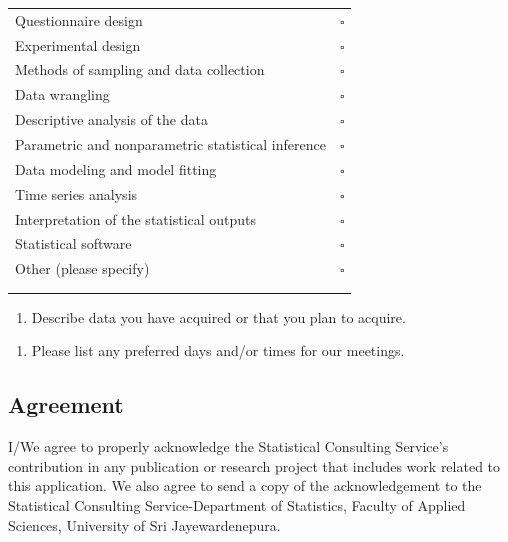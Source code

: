 \documentclass[
  a4paper]{article}
\providecommand{\tightlist}{%
  \setlength{\itemsep}{0pt}\setlength{\parskip}{0pt}}
\begin{document}
\begin{table}[!h]
\center
\begin{tabular}{l|l}
\hline
Questionnaire design & $\square$ \\ 
Experimental design &  $\square$  \\ 
Methods of sampling and data collection &   $\square$ \\
Data wrangling &  $\square$\\
Descriptive analysis of the data &  $\square$\\
Parametric and nonparametric statistical inference &  $\square$\\
Data modeling and model fitting &  $\square$ \\
Time series analysis &  $\square$ \\
Interpretation of the statistical outputs &  $\square$\\
Statistical software &  $\square$\\
Other (please specify) &  $\square$\\
 &  \\
 &  \\
\hline
\end{tabular}
\end{table}

\begin{enumerate}
\def\labelenumi{\arabic{enumi}.}
\setcounter{enumi}{5}
\tightlist
\item
  Describe data you have acquired or that you plan to acquire.
\end{enumerate}

\vspace{3cm}

\begin{enumerate}
\def\labelenumi{\arabic{enumi}.}
\setcounter{enumi}{6}
\tightlist
\item
  Please list any preferred days and/or times for our meetings.
\end{enumerate}

\vspace{1cm}

\hypertarget{agreement}{%
\subsection{Agreement}\label{agreement}}

I/We agree to properly acknowledge the Statistical Consulting Service's
contribution in any publication or research project that includes work
related to this application. We also agree to send a copy of the
acknowledgement to the Statistical Consulting Service-Department of
Statistics, Faculty of Applied Sciences, University of Sri
Jayewardenepura.
\end{document}
